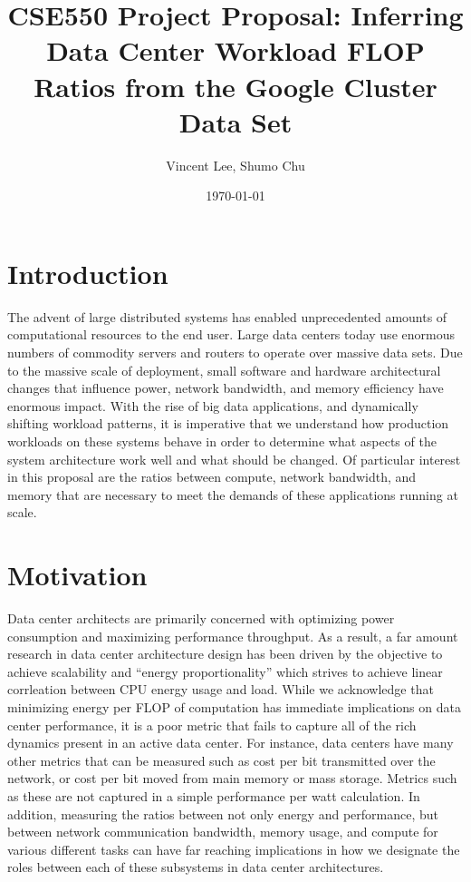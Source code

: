 \documentclass{article}
\begin{document}
\title{CSE550 Project Proposal: Inferring Data Center Workload FLOP Ratios from the Google Cluster Data Set}
\author{Vincent Lee, Shumo Chu}
\date{\today}

\maketitle


\section{Introduction}

The advent of large distributed systems has enabled unprecedented amounts of computational resources to the end user.
Large data centers today use enormous numbers of commodity servers and routers to operate over massive data sets.
Due to the massive scale of deployment, small software and hardware architectural changes that influence power, network bandwidth, and memory efficiency have enormous impact.
With the rise of big data applications, and dynamically shifting workload patterns, it is imperative that we understand how production workloads on these systems behave in order to determine what aspects of the system architecture work well and what should be changed.
Of particular interest in this proposal are the ratios between compute, network bandwidth, and memory that are necessary to meet the demands of these applications running at scale.


\section{Motivation}

Data center architects are primarily concerned with optimizing power consumption and maximizing performance throughput.
As a result, a far amount research in data center architecture design has been driven by the objective to achieve scalability and ``energy proportionality'' which strives to achieve linear corrleation between CPU energy usage and load.
While we acknowledge that minimizing energy per FLOP of computation has immediate implications on data center performance, it is a poor metric that fails to capture all of the rich dynamics present in an active data center.
For instance, data centers have many other metrics that can be measured such as cost per bit transmitted over the network, or cost per bit moved from main memory or mass storage.
Metrics such as these are not captured in a simple performance per watt calculation.
In addition, measuring the ratios between not only energy and performance, but between network communication bandwidth, memory usage, and compute for various different tasks can have far reaching implications in how we designate the roles between each of these subsystems in data center architectures.
\end{document}
